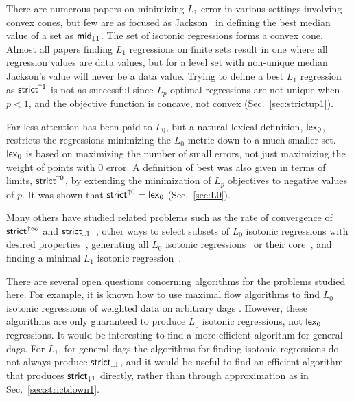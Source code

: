 \documentclass[11pt]{article}
\newcommand{\wmeandown}[2]{\ensuremath{\mathsf{mid}_{\downarrow #1}\ifthenelse{\equal{#2}{}}{}{(#2)}}}
\newcommand{\Strictdown}[2]{\ensuremath{\mathsf{strict}_{\downarrow{#1}}\ifthenelse{\equal{#2}{}}{}{(#2)}}}
\newcommand{\Strictup}[2]{\ensuremath{\mathsf{strict}^{\uparrow {#1}}\ifthenelse{\equal{#2}{}}{}{(#2)}}}
\newcommand{\lex}[2]{\ensuremath{\mathsf{lex}_{#1} \ifthenelse{\equal{#2}{}}{}{(#2)}}}
\begin{document}
There are numerous papers on minimizing $L_1$ error in various settings involving convex cones, but few are as focused as Jackson~\cite{Jackson_Median} in defining the best median value of a set as \wmeandown{1}{}.
The set of isotonic regressions forms a convex cone.
Almost all papers finding $L_1$ regressions on finite sets result in one where all regression values are data values, but for a level set with non-unique median Jackson's value will never be a data value.
Trying to define a best $L_1$ regression as \Strictup{1}{} is not as successful since $L_p$-optimal regressions are not unique when $p<1$, and the objective function is concave, not convex (Sec.~\ref{sec:strictup1}).

Far less attention has been paid to $L_0$, but a natural lexical definition, \lex{0}{}, restricts the regressions minimizing the $L_0$ metric down to a much smaller set.
\lex{0}{} is based on maximizing the number of small errors, not just maximizing the weight of points with 0 error.
A definition of best was also given in terms of limits, \Strictup{0}{}, by extending the minimization of $L_p$ objectives to negative values of $p$.
It was shown that $\Strictup{0}{} = \lex{0}{}$ (Sec.~\ref{sec:L0}).

Many others have studied related problems such as the rate of convergence of \Strictup{\infty}{} and \Strictdown{1}{}~\cite{EggerTaylorPolya1ConvRate93,QFOMMB_PolyaL1}, other ways to select subsets of $L_0$ isotonic regressions with desired properties~\cite{RadeBM_Relabel09,QL0Secondary}, generating all $L_0$ isotonic regressions~\cite{StegemanFeeldersAllL0_11} or their core~\cite{RadeBM_Relabel12}, and finding a minimal $L_1$ isotonic regression~\cite{ShiMinL195}.

There are several open questions concerning algorithms for the problems studied here.
For example, it is known how to use maximal flow algorithms to find $L_0$ isotonic regressions of weighted data on arbitrary dags
\cite{Relab_Feelders06,PP_Relabel,RadeBM_Relabel09,QL0Secondary}.
However, these algorithms are only guaranteed to produce $L_0$ isotonic regressions, not \lex{0}{} regressions.
It would be interesting to find a more efficient algorithm for general dags.
For $L_1$, for general dags the algorithms for finding isotonic regressions do not always produce \Strictdown{1}{}, and it would be useful to find an efficient algorithm that produces \Strictdown{1}{} directly, rather than through approximation as in Sec.~\ref{sec:strictdown1}.
\end{document}
